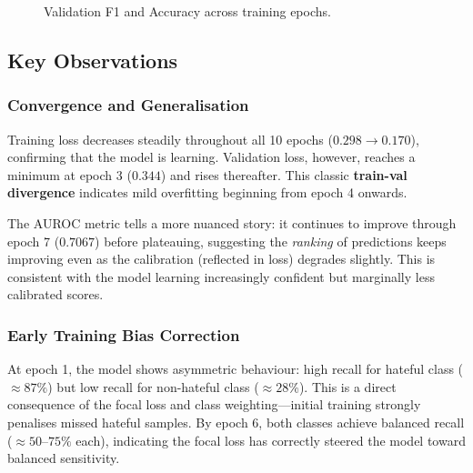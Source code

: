 \documentclass[12pt,a4paper]{article}
\begin{document}
\begin{figure}[H]
\centering
{}
\caption{Validation F1 and Accuracy across training epochs.}
\label{fig:f1acc}
\end{figure}

\subsection{Key Observations}

\subsubsection{Convergence and Generalisation}
Training loss decreases steadily throughout all 10 epochs ($0.298 \rightarrow 0.170$), confirming that the model is learning. Validation loss, however, reaches a minimum at epoch 3 ($0.344$) and rises thereafter. This classic \textbf{train-val divergence} indicates mild overfitting beginning from epoch 4 onwards.

The AUROC metric tells a more nuanced story: it continues to improve through epoch 7 ($0.7067$) before plateauing, suggesting the \textit{ranking} of predictions keeps improving even as the calibration (reflected in loss) degrades slightly. This is consistent with the model learning increasingly confident but marginally less calibrated scores.

\subsubsection{Early Training Bias Correction}
At epoch 1, the model shows asymmetric behaviour: high recall for hateful class ($\approx 87\%$) but low recall for non-hateful class ($\approx 28\%$). This is a direct consequence of the focal loss and class weighting---initial training strongly penalises missed hateful samples. By epoch 6, both classes achieve balanced recall ($\approx 50\text{--}75\%$ each), indicating the focal loss has correctly steered the model toward balanced sensitivity.
\end{document}

